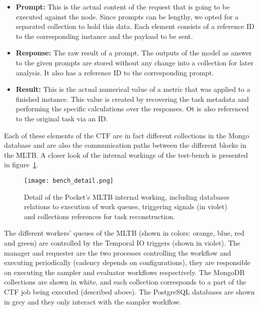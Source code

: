 \begin{itemize}
\begin{itemize}
    \end{itemize}
    \item \textbf{Prompt:} This is the actual content of the request that is going to be executed against the node. Since prompts can be lengthy, we opted for a separated collection to hold this data. Each element consists of a reference ID to the corresponding instance and the payload to be sent.
    \item \textbf{Response:} The raw result of a prompt. The outputs of the model as answer to the given prompts are stored without any change into a collection for later analysis. It also has a reference ID to the corresponding prompt.
    \item \textbf{Result:} This is the actual numerical value of a metric that was applied to a finished instance. This value is created by recovering the task metadata and performing the specific calculations over the responses. Ot is also referenced to the original task via an ID.
\end{itemize}

Each of these elements of the \gls{CTF} are in fact different collections in the Mongo database and are also the communication paths between the different blocks in the \gls{MLTB}. A closer look of the internal workings of the test-bench is presented in figure~\ref{fig:bench_detail}.
\begin{figure}[H]
    \centering
    \texttt{[image: bench\_detail.png]}
    \caption{Detail of the Pocket's \gls{MLTB} internal working, including databases relations to execution of work queues, triggering signals (in violet) and collections references for task reconstruction.}
    \label{fig:bench_detail}
\end{figure} 
The different workers' queues of the \gls{MLTB} (shown in colors: orange, blue, red and green) are controlled by the Temporal IO triggers (shown in violet). The manager and requester are the two processes controlling the workflow and executing periodically (cadency depends on configurations), they are responsible on executing the sampler and evaluator workflows respectively. The MongoDB collections are shown in white, and each collection corresponds to a part of the \gls{CTF} job being executed (described above). The PostgreSQL databases are shown in grey and they only interact with the sampler workflow.

